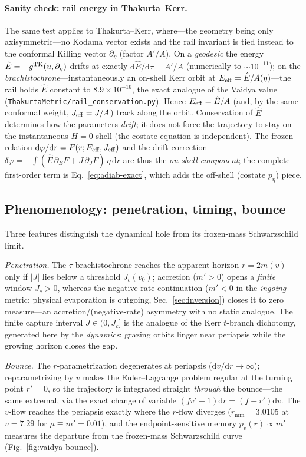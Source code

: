 \documentclass[
    aps, prd, twocolumn, superscriptaddress,
    showpacs, nofootinbib, floatfix
]{revtex4-2}
\newcommand{\Ehat}{\hat E}
\newcommand{\Jc}{J_{c}}
\newcommand{\dd}{\mathrm{d}}
\begin{document}
\paragraph{Sanity check: rail energy in Thakurta--Kerr.} The same test applies
to Thakurta--Kerr, where---the geometry being only axisymmetric---no Kodama
vector exists and the rail invariant is tied instead to the conformal Killing
vector $\partial_\eta$ (factor $A'/A$). On a \emph{geodesic} the energy
$\Ehat=-g^{\rm TK}(u,\partial_\eta)$ drifts at exactly $\mathrm{d}\Ehat/\mathrm{d}\tau=A'/A$
(numerically to $\sim\!10^{-11}$); on the \emph{brachistochrone}---instantaneously
an on-shell Kerr orbit at $E_{\rm eff}=\Ehat/A(\eta)$---the rail holds $\Ehat$
constant to $8.9\times10^{-16}$, the exact analogue of the Vaidya value
(\texttt{ThakurtaMetric/rail\_conservation.py}). Hence $E_{\rm eff}=\Ehat/A$
(and, by the same conformal weight, $J_{\rm eff}=J/A$) track along the orbit.
Conservation of $\Ehat$ determines how the parameters \emph{drift}; it does not force
the trajectory to stay on the instantaneous $H=0$ shell (the costate equation is
independent). The frozen relation
$\mathrm{d}\varphi/\mathrm{d}r=F(r;E_{\rm eff},J_{\rm eff})$ and the drift correction
$\delta\varphi=-\int(\Ehat\,\partial_E F+J\,\partial_J F)\,\eta\,\mathrm{d}r$ are thus
the \emph{on-shell component}; the complete first-order term is
Eq.~\eqref{eq:adiab-exact}, which adds the off-shell (costate $p_\eta$) piece.


\subsection{Phenomenology: penetration, timing, bounce}
\label{sec:vaidya-pheno}
Three features distinguish the dynamical hole from its frozen-mass
Schwarzschild limit.

\emph{Penetration.} The $\tau$-brachistochrone reaches the apparent horizon
$r=2m(v)$ only if $|J|$ lies below a threshold $J_c(v_0)$; accretion ($m'>0$)
opens a \emph{finite} window $J_c>0$, whereas the negative-rate continuation
($m'<0$ in the \emph{ingoing} metric; physical evaporation is outgoing,
Sec.~\ref{sec:inversion}) closes it to zero measure---an accretion/(negative-rate)
asymmetry with no static analogue. The
finite capture interval $J\in(0,\Jc]$ is the analogue of the Kerr $t$-branch
dichotomy, generated here by the \emph{dynamics}: grazing orbits linger near
periapsis while the growing horizon closes the gap.

\emph{Bounce.} The $r$-parametrization degenerates at periapsis
($\dd v/\dd r\to\infty$); reparametrizing by $v$ makes the Euler--Lagrange
problem regular at the turning point $r'=0$, so the trajectory is integrated
straight \emph{through} the bounce---the same extremal, via the exact change of
variable $(f v'-1)\dd r=(f-r')\dd v$. The $v$-flow reaches the periapsis exactly
where the $r$-flow diverges ($r_{\min}=3.0105$ at $v=7.29$ for $\mu\equiv m'=0.01$),
and the endpoint-sensitive memory $p_v(r)\propto m'$ measures the departure from the
frozen-mass Schwarzschild curve (Fig.~\ref{fig:vaidya-bounce}).
\end{document}

